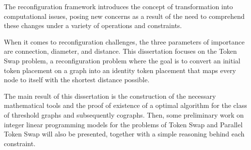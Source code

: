 The reconfiguration framework introduces the concept of 
transformation into computational issues, posing new 
concerns as a result of the need to comprehend these 
changes under a variety of operations and constraints.

When it comes to reconfiguration challenges, the three 
parameters of importance are connection, diameter,
and distance.
This dissertation focuses on the Token Swap problem, 
a reconfiguration problem where the goal is to convert 
an initial token placement on a graph into an identity 
token placement that maps every node to itself with the 
shortest distance possible.

The main result of this dissertation is the construction
of the necessary mathematical tools and the proof of
existence of a optimal algorithm for the class of threshold
graphs and subsequently cographs.
Then, some preliminary work on integer linear programming
models for the problems of Token Swap and Parallel Token Swap 
will also be presented, together with a simple reasoning
behind each constraint.
